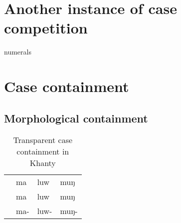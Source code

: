 \section{Another instance of case competition}

numerals


\section{Case containment}

\subsection{Morphological containment}

\begin{table}[h]
  \center
	\caption {Transparent case containment in Khanty \citep[16]{nikolaeva1999}}
	\begin{minipage}{0.7\linewidth}
		\begin{tabularx}{\textwidth}{c *{3}{Z}}
		\toprule
              & 
              & 
              &                                \\
		\midrule
     & ma
              & luw
              & muŋ                                     \\
     & ma
              & luw
              & muŋ                           \\
     & ma-\textcolor{DG}{}
              & luw-\textcolor{DG}{}
              & muŋ-\textcolor{DG}{}  \\
		\bottomrule
		\end{tabularx}
	\end{minipage}
\end{table}





